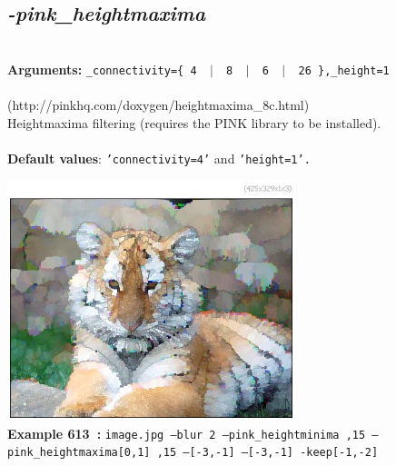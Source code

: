 \documentclass[a4paper,11pt,twoside]{book}
\begin{document}
\subsection{\emph{-pink\_heightmaxima} }\vspace*{-0.5em}
~\\\textbf{Arguments: } 
{\small \texttt{\_connectivity=\{ 4 ~$|$~ 8 ~$|$~ 6 ~$|$~ 26 \},\_height=1}}\\~\\
(http://pinkhq.com/doxygen/heightmaxima\_8c.html)
~\\Heightmaxima filtering (requires the PINK library to be installed).
~\\~\\\textbf{Default values}: {\small \texttt{'connectivity=4'} and \texttt{'height=1'.}}
\begin{center}\includegraphics[keepaspectratio=true,height=7cm,width=\textwidth]{img/gmic_def613.jpg}\\
{\footnotesize \textbf{Example 613~:} \texttt{image.jpg --blur 2 --pink\_heightminima ,15 --pink\_heightmaxima[0,1] ,15 --[-3,-1] --[-3,-1] -keep[-1,-2]}}
\end{center}
\end{document}
